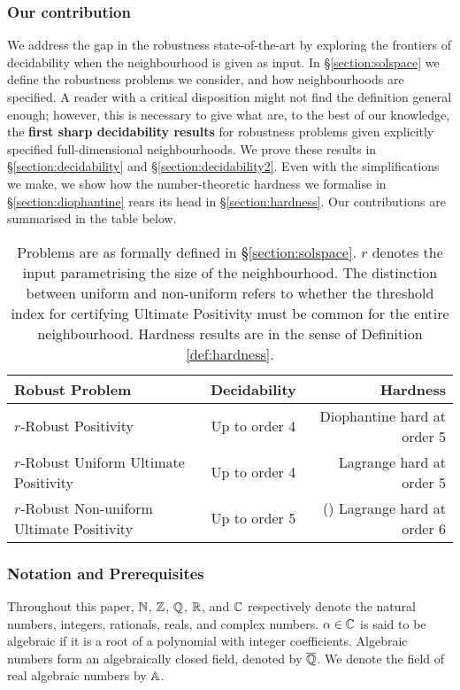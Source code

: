 \subsubsection*{Our contribution}
We address the gap in the robustness state-of-the-art by exploring the frontiers of decidability when the neighbourhood is given as input. In \S\ref{section:solspace} we define the robustness problems we consider, and how neighbourhoods are specified. A reader with a critical disposition might not find the definition general enough; however, this is necessary to give what are, to the best of our knowledge, the \textbf{first sharp decidability results} for robustness problems given explicitly specified full-dimensional neighbourhoods. We prove these results in \S\ref{section:decidability} and \S\ref{section:decidability2}. Even with the simplifications we make, we show how the number-theoretic hardness we formalise in \S\ref{section:diophantine} rears its head in \S\ref{section:hardness}. Our contributions are summarised in the table below.
\begin{table}[H]
\begin{tabular}{|l|c|r|}
  \hline
   \textbf{Robust Problem}& \textbf{Decidability }& {\bf Hardness} \\
  \hline
  $r$-Robust Positivity & Up to order 4 & Diophantine hard at order 5\\
  $r$-Robust Uniform Ultimate Positivity & Up to order 4 & Lagrange hard at order 5 \\
  $r$-Robust Non-uniform Ultimate Positivity & Up to order 5 & (\cite{originalarxiv,joeljames3}) Lagrange hard at order 6 
  \\
  \hline
\end{tabular}

\caption{Problems are as formally defined in \S\ref{section:solspace}. $r$ denotes the input parametrising the size of the neighbourhood. The distinction between uniform and non-uniform refers to whether the threshold index for certifying Ultimate Positivity must be common for the entire neighbourhood. Hardness results are in the sense of Definition \ref{def:hardness}.}%
  \label{tab:results}
\end{table}

\subsubsection*{Notation and Prerequisites}
Throughout this paper,  $\mathbb{N}$, $\mathbb{Z}$, $\mathbb{Q}$, $\mathbb{R}$, and $\mathbb{C}$ respectively denote the natural numbers, integers, rationals, reals, and complex numbers. $\alpha \in \mathbb{C}$ is said to be algebraic if it is a root of a polynomial with integer coefficients. Algebraic numbers form an algebraically closed field, denoted by $\overline{\mathbb{Q}}$. We denote the field of real algebraic numbers by $\mathbb{A}$.

